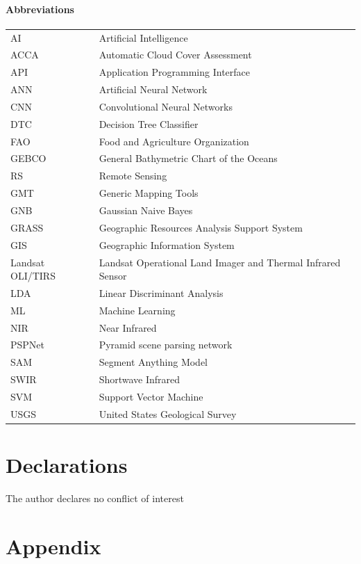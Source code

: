 \documentclass[sn-mathphys-num]{sn-jnl}%
\theoremstyle{thmstyleone}%
\theoremstyle{thmstyletwo}%
\theoremstyle{thmstylethree}%
\begin{document}
\paragraph{Abbreviations}

\begin{tabular}{@{}ll}
AI & Artificial Intelligence \\
{ACCA} & {Automatic Cloud Cover Assessment} \\ 
{API} & {Application Programming Interface} \\
{ANN} & {Artificial Neural Network} \\
{CNN} & {Convolutional Neural Networks} \\ 
DTC & Decision Tree Classifier \\
FAO & Food and Agriculture Organization \\ 
GEBCO & General Bathymetric Chart of the Oceans \\
RS & Remote Sensing \\
GMT & Generic Mapping Tools \\
GNB & Gaussian Naive Bayes \\
GRASS & Geographic Resources Analysis Support System \\
GIS & Geographic Information System \\
Landsat OLI/TIRS & Landsat Operational Land Imager and Thermal Infrared Sensor \\
LDA & Linear Discriminant Analysis \\
ML & Machine Learning \\
NIR & Near Infrared \\
{PSPNet} & {Pyramid scene parsing network} \\
{SAM} & {Segment Anything Model} \\
SWIR & Shortwave Infrared \\
SVM & Support Vector Machine \\
USGS & United States Geological Survey \\
\end{tabular}

\backmatter

\section*{Declarations}

The author declares no conflict of interest

\section{Appendix}\label{sec14}
\end{document}
